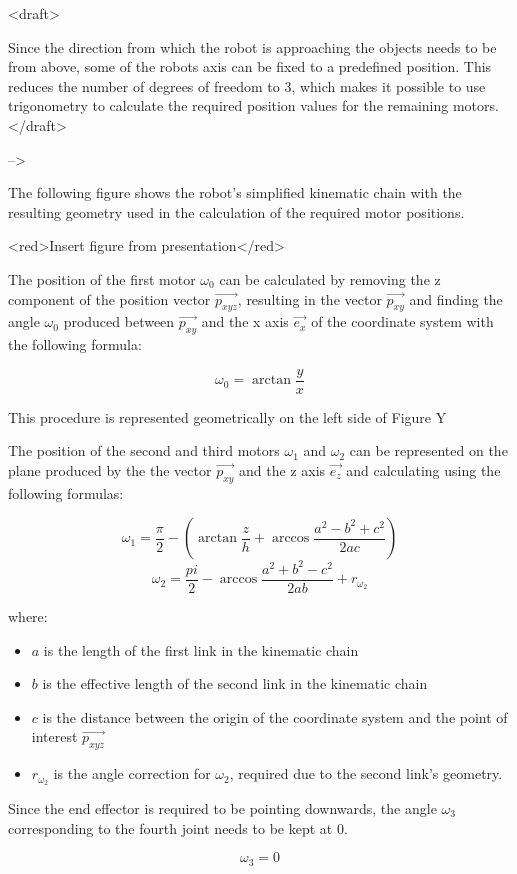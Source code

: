 <draft>

Since the direction from which the robot is approaching the objects needs to be from above, some of the robots axis can be fixed to a predefined position. This reduces the number of degrees of freedom to 3, which makes it possible to use trigonometry to calculate the required position values for the remaining motors.
</draft> 

-->

The following figure shows the robot's simplified kinematic chain with the resulting geometry used in the calculation of the required motor positions.


<red>Insert figure from presentation</red>

The position of the first motor $\omega_0$ can be calculated by removing the z component of the position vector $\vec{p_{xyz}}$, resulting in the vector $\vec{p_{xy}}$ and finding the angle $\omega_0$ produced between $\vec{p_{xy}}$ and the x axis $\vec{e_x}$ of the coordinate system with the following formula:

$$\omega_0=\arctan{\frac{y}{x}}$$

This procedure is represented geometrically on the left side of Figure Y

The position of the second and third motors $\omega_1$ and $\omega_2$ can be represented on the plane produced by the the vector $\vec{p_{xy}}$ and the z axis $\vec{e_z}$ and calculating using the following formulas:

$$\omega_1=\frac{\pi}{2} - (\arctan{\frac{z}{h}} + \arccos{\frac{a^2-b^2+c^2}{2ac}})$$
$$\omega_2 = \frac{pi}{2} - \arccos{\frac{a^2+b^2-c^2}{2ab}} + r_{\omega_2}$$


where:
\begin{itemize}
    \item $a$ is the length of the first link in the kinematic chain
    \item $b$ is the effective length of the second link in the kinematic chain
    \item $c$ is the distance between the origin of the coordinate system and the point of interest $\vec{p_{xyz}}$
    \item $r_{\omega_2}$ is the angle correction for $\omega_2$, required due to the second link's geometry.
\end{itemize}
Since the end effector is required to be pointing downwards, the angle $\omega_3$ corresponding to the fourth joint needs to be kept at 0.

$$\omega_3 = 0$$

